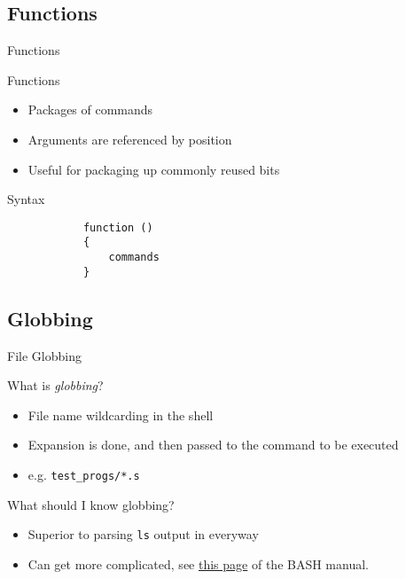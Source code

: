 \documentclass[table,dvipsnames]{beamer}
\begin{document}
\subsection{Functions}

\begin{frame}[fragile]{Functions}
	\begin{block}{Functions}
		\begin{itemize}
			\item Packages of commands
			\item Arguments are referenced by position
			\item Useful for packaging up commonly reused bits
		\end{itemize}
	\end{block}
	\begin{block}{Syntax}
		\begin{verbatim}
			function () 
			{
			    commands
			}
		\end{verbatim}
	\end{block}
\end{frame}

\subsection{Globbing}

\begin{frame}{File Globbing}
	\begin{block}{What is \emph{globbing}?}
		\begin{itemize}
			\item File name wildcarding in the shell
			\item Expansion is done, and then passed to the command to be
				executed
			\item e.g. \texttt{test\_progs/*.s}
		\end{itemize}
	\end{block}
	\begin{block}{What should I know globbing?}
		\begin{itemize}
			\item Superior to parsing \texttt{ls} output in everyway
			\item Can get more complicated, see
				\href{http://www.gnu.org/software/bash/manual/html_node/Pattern-Matching.html\#Pattern-Matching}{this
				page} of the BASH manual.
		\end{itemize}
	\end{block}
\end{frame}
\end{document}
